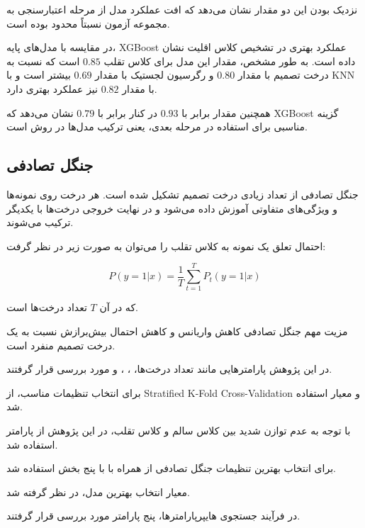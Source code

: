 \documentclass[10pt,a4paper,twocolumn]{article}
\begin{document}
نزدیک بودن این دو مقدار نشان می‌دهد که افت عملکرد مدل از
مرحله اعتبارسنجی به مجموعه آزمون نسبتاً محدود بوده است.

در مقایسه با مدل‌های پایه، XGBoost عملکرد بهتری در تشخیص
کلاس اقلیت نشان داده است. به طور مشخص، مقدار
 این مدل برای کلاس تقلب $0.85$ است که نسبت به
درخت تصمیم با مقدار $0.80$ و رگرسیون لجستیک با مقدار
$0.69$ بیشتر است و با KNN با مقدار $0.82$ نیز عملکرد
بهتری دارد.

همچنین مقدار  برابر با $0.93$ در کنار
 برابر با $0.79$ نشان می‌دهد که XGBoost گزینه
مناسبی برای استفاده در مرحله بعدی، یعنی ترکیب مدل‌ها در
روش  است.


\subsection{جنگل تصادفی}

جنگل تصادفی از تعداد زیادی درخت تصمیم تشکیل شده است.
هر درخت روی نمونه‌ها و ویژگی‌های متفاوتی آموزش داده می‌شود
و در نهایت خروجی درخت‌ها با یکدیگر ترکیب می‌شوند.

احتمال تعلق یک نمونه به کلاس تقلب را می‌توان به صورت زیر
در نظر گرفت:

\[
P(y=1|x)
=
\frac{1}{T}
\sum_{t=1}^{T}
P_t(y=1|x)
\]

که در آن $T$ تعداد درخت‌ها است.

مزیت مهم جنگل تصادفی کاهش واریانس و کاهش احتمال
بیش‌برازش نسبت به یک درخت تصمیم منفرد است.

در این پژوهش پارامترهایی مانند تعداد درخت‌ها،
، ،
 و  مورد بررسی
قرار گرفتند.

برای انتخاب تنظیمات مناسب، از Stratified K-Fold
Cross-Validation و معیار  استفاده شد.

با توجه به عدم توازن شدید بین کلاس سالم و کلاس تقلب، در این
پژوهش از پارامتر  استفاده شد.

برای انتخاب بهترین تنظیمات جنگل تصادفی از
 همراه با
 با پنج بخش استفاده شد.

معیار انتخاب بهترین مدل،  در نظر گرفته شد.

در فرآیند جستجوی هایپرپارامترها، پنج پارامتر مورد بررسی قرار
گرفتند.
\end{document}
